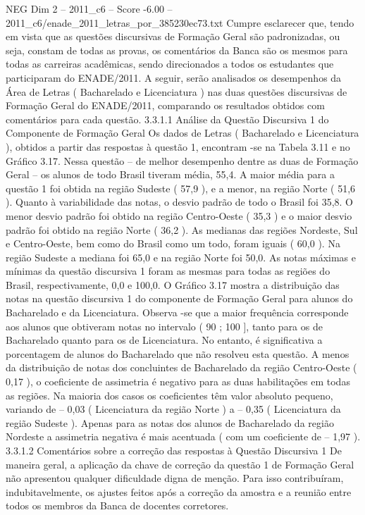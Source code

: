 \begin{textsample}{NEG Dim 2 – 2011\_c6 – Score -6.00 – 2011\_c6/enade\_2011\_letras\_por\_385230ec73.txt}
Cumpre esclarecer que, tendo em vista que as questões discursivas de Formação Geral são padronizadas, ou seja, constam de todas as provas, os comentários da Banca são os mesmos para todas as carreiras acadêmicas, sendo direcionados a todos os estudantes que participaram do ENADE/2011.
A seguir, serão analisados os desempenhos da Área de Letras ( Bacharelado e Licenciatura ) nas duas questões discursivas de Formação Geral do ENADE/2011, comparando os resultados obtidos com comentários para cada questão. 3.3.1.1 Análise da Questão Discursiva 1 do Componente de Formação Geral Os dados de Letras ( Bacharelado e Licenciatura ), obtidos a partir das respostas à questão 1, encontram -se na Tabela 3.11 e no Gráfico 3.17.
Nessa questão – de melhor desempenho dentre as duas de Formação Geral – os alunos de todo Brasil tiveram média, 55,4.
A maior média para a questão 1 foi obtida na região Sudeste ( 57,9 ), e a menor, na região Norte ( 51,6 ).
Quanto à variabilidade das notas, o desvio padrão de todo o Brasil foi 35,8.
O menor desvio padrão foi obtido na região Centro-Oeste ( 35,3 ) e o maior desvio padrão foi obtido na região Norte ( 36,2 ).
As medianas das regiões Nordeste, Sul e Centro-Oeste, bem como do Brasil como um todo, foram iguais ( 60,0 ).
Na região Sudeste a mediana foi 65,0 e na região Norte foi 50,0.
As notas máximas e mínimas da questão discursiva 1 foram as mesmas para todas as regiões do Brasil, respectivamente, 0,0 e 100,0.
O Gráfico 3.17 mostra a distribuição das notas na questão discursiva 1 do componente de Formação Geral para alunos do Bacharelado e da Licenciatura.
Observa -se que a maior frequência corresponde aos alunos que obtiveram notas no intervalo ( 90 ; 100 ], tanto para os de Bacharelado quanto para os de Licenciatura.
No entanto, é significativa a porcentagem de alunos do Bacharelado que não resolveu esta questão.
A menos da distribuição de notas dos concluintes de Bacharelado da região Centro-Oeste ( 0,17 ), o coeficiente de assimetria é negativo para as duas habilitações em todas as regiões.
Na maioria dos casos os coeficientes têm valor absoluto pequeno, variando de – 0,03 ( Licenciatura da região Norte ) a – 0,35 ( Licenciatura da região Sudeste ).
Apenas para as notas dos alunos de Bacharelado da região Nordeste a assimetria negativa é mais acentuada ( com um coeficiente de – 1,97 ). 3.3.1.2 Comentários sobre a correção das respostas à Questão Discursiva 1 De maneira geral, a aplicação da chave de correção da questão 1 de Formação Geral não apresentou qualquer dificuldade digna de menção.
Para isso contribuíram, indubitavelmente, os ajustes feitos após a correção da amostra e a reunião entre todos os membros da Banca de docentes corretores.

\end{textsample}
